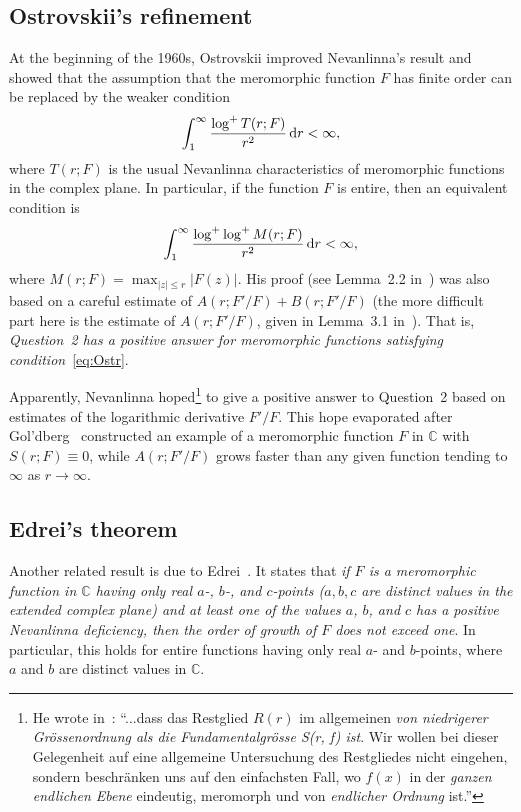 \documentclass[12pt]{paper}
\newcommand{\bC}{\mathbb C}
\begin{document}
\subsection{Ostrovskii's refinement} 
At the beginning of the 1960s, Ostrovskii improved Nevanlinna's result and showed that the assumption that
the meromorphic function $F$ has finite order can be replaced by the weaker condition
\begin{equation}\label{eq:Ostr}
\int_1^\infty \frac{\log^+ T(r; F)}{r^2}\, {\rm d}r<\infty,
\end{equation}
where $T(r; F)$ is the usual Nevanlinna characteristics of meromorphic functions in the complex plane.
In particular, if the function $F$ is entire, then an equivalent condition is 
\[
\int_1^\infty \frac{\log^+\log^+ M(r; F)}{r^2}\, {\rm d}r<\infty,
\]
where $M(r; F) = \max_{|z|\le r} |F(z)|$. His proof
 (see Lemma~2.2 in~\cite[Chapter~VI \S2]{GO}) was also based on a careful estimate of 
 $A(r; F'/F) +B(r; F'/F)$ \cite[Chapter III, Theorems 3.1 and 3.3]{GO} 
(the more difficult part here is the estimate of $A(r; F'/F)$, given in Lemma~3.1 in~\cite[Chapter~III \S3]{GO}). 
That is, {\em Question~2 has a positive answer for meromorphic functions satisfying condition}~\eqref{eq:Ostr}.

Apparently, Nevanlinna  hoped\footnote
{He wrote in~\cite[p.18]{Nev}:
``...dass das Restglied $R(r)$ im allgemeinen {\em von niedrigerer Grössenordnung als die Fundamentalgrösse S(r, f) ist}. 
Wir wollen bei dieser Gelegenheit auf eine allgemeine Untersuchung des Restgliedes nicht eingehen, sondern beschränken 
uns auf den einfachsten Fall, wo $f(x)$ in der {\em ganzen endlichen Ebene} eindeutig, meromorph und von {\em endlicher Ordnung} ist.''
}
to give a positive answer to Question~2 based on estimates of the logarithmic derivative
$F'/F$. This hope evaporated 
after Gol'dberg~\cite{Gold} constructed an example of a meromorphic function $F$ in $\bC$ with $S(r; F) \equiv 0$,
while $A(r; F'/F)$ grows faster than any given function tending to $\infty$ as $r\to\infty$.

\subsection{Edrei's theorem}
Another related result is due to Edrei~\cite[Theorem~1]{Edrei}. 
It states that {\em if $F$ is a meromorphic function in $\bC$ having only real $a$-, $b$-, and $c$-points 
($a, b, c$ are distinct values in the extended complex plane) and at least one of the values
$a$, $b$, and $c$ has a positive Nevanlinna deficiency, then the order of growth 
of $F$ does not exceed one}. In particular, this holds for entire functions having only real
$a$- and $b$-points, where $a$ and $b$ are distinct values in $\bC$. 
\end{document}
